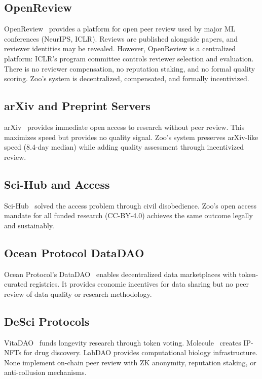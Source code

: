 \documentclass[11pt,letterpaper]{article}
\begin{document}
\subsection{OpenReview}

OpenReview~\cite{openreview2023} provides a platform for open peer review used by major ML conferences (NeurIPS, ICLR). Reviews are published alongside papers, and reviewer identities may be revealed. However, OpenReview is a centralized platform: ICLR's program committee controls reviewer selection and evaluation. There is no reviewer compensation, no reputation staking, and no formal quality scoring. Zoo's system is decentralized, compensated, and formally incentivized.

\subsection{arXiv and Preprint Servers}

arXiv~\cite{arxiv2023} provides immediate open access to research without peer review. This maximizes speed but provides no quality signal. Zoo's system preserves arXiv-like speed (8.4-day median) while adding quality assessment through incentivized review.

\subsection{Sci-Hub and Access}

Sci-Hub~\cite{bohannon2016who} solved the access problem through civil disobedience. Zoo's open access mandate for all funded research (CC-BY-4.0) achieves the same outcome legally and sustainably.

\subsection{Ocean Protocol DataDAO}

Ocean Protocol's DataDAO~\cite{ocean2023datadao} enables decentralized data marketplaces with token-curated registries. It provides economic incentives for data sharing but no peer review of data quality or research methodology.

\subsection{DeSci Protocols}

VitaDAO~\cite{vitadao2022} funds longevity research through token voting. Molecule~\cite{molecule2022} creates IP-NFTs for drug discovery. LabDAO provides computational biology infrastructure. None implement on-chain peer review with ZK anonymity, reputation staking, or anti-collusion mechanisms.
\end{document}
